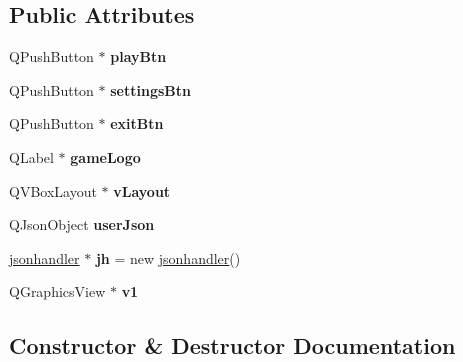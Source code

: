 \subsection*{Public Attributes}
\begin{DoxyCompactItemize}
\item 
\mbox{\label{classg2__startmenu_a01a68297e5716b4cf38a1f750afa8bcb}} 
Q\+Push\+Button $\ast$ {\bfseries play\+Btn}
\item 
\mbox{\label{classg2__startmenu_a66ac1dda2bc33ef328b847d6125d7296}} 
Q\+Push\+Button $\ast$ {\bfseries settings\+Btn}
\item 
\mbox{\label{classg2__startmenu_a3cee06c0bc05368195dde924403951ac}} 
Q\+Push\+Button $\ast$ {\bfseries exit\+Btn}
\item 
\mbox{\label{classg2__startmenu_a8944d2426bb7a093aafd1b47c40c3da8}} 
Q\+Label $\ast$ {\bfseries game\+Logo}
\item 
\mbox{\label{classg2__startmenu_ad156cdc0c63d394dafa561c50d713f2c}} 
Q\+V\+Box\+Layout $\ast$ {\bfseries v\+Layout}
\item 
\mbox{\label{classg2__startmenu_ab0a28f0dc451be5b08b777aae37381eb}} 
Q\+Json\+Object {\bfseries user\+Json}
\item 
\mbox{\label{classg2__startmenu_a148870335d7c3196da239626772781d5}} 
\hyperlink{classjsonhandler}{jsonhandler} $\ast$ {\bfseries jh} = new \hyperlink{classjsonhandler}{jsonhandler}()
\item 
\mbox{\label{classg2__startmenu_a931b830df79ae145b5d8cf030357bc7b}} 
Q\+Graphics\+View $\ast$ {\bfseries v1}
\end{DoxyCompactItemize}


\subsection{Constructor \& Destructor Documentation}
\mbox{\label{classg2__startmenu_a64af506bcf731b441c756fdf389fdffe}} 
